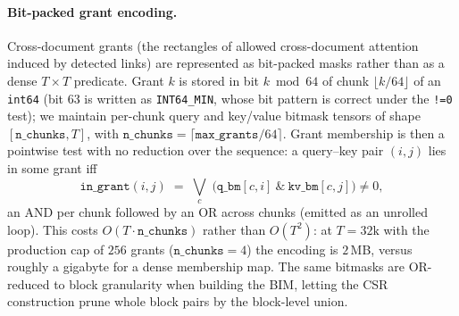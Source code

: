 \paragraph{Bit-packed grant encoding.}
Cross-document grants (the rectangles of allowed cross-document attention induced by
detected links) are represented as bit-packed masks rather than as a dense $T\times T$
predicate. Grant $k$ is stored in bit $k \bmod 64$ of chunk $\lfloor k/64\rfloor$ of an
\texttt{int64} (bit 63 is written as \texttt{INT64\_MIN}, whose bit pattern is
correct under the \texttt{!=0} test); we maintain per-chunk query and key/value
bitmask tensors of shape $[\texttt{n\_chunks}, T]$, with
$\texttt{n\_chunks}=\lceil \texttt{max\_grants}/64\rceil$. Grant membership is then a
pointwise test with no reduction over the sequence: a query--key pair $(i,j)$ lies in
some grant iff
\[
\texttt{in\_grant}(i,j) \;=\; \bigvee_{c}\;\bigl(\texttt{q\_bm}[c,i]\ \texttt{\&}\ \texttt{kv\_bm}[c,j]\bigr)\neq 0,
\]
an AND per chunk followed by an OR across chunks (emitted as an unrolled loop). This
costs $O(T\cdot\texttt{n\_chunks})$ rather than $O(T^2)$: at $T=32\text{k}$ with the
production cap of $256$ grants ($\texttt{n\_chunks}=4$) the encoding is $2$\,MB, versus
roughly a gigabyte for a dense membership map. The same bitmasks are OR-reduced to
block granularity when building the BIM, letting the CSR construction prune whole block
pairs by the block-level union.

